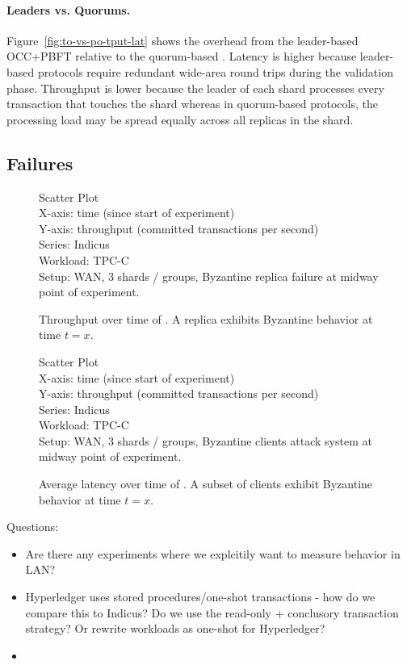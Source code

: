\paragraph{Leaders vs. Quorums.} Figure~\ref{fig:to-vs-po-tput-lat} shows the overhead from the leader-based
OCC+PBFT relative to the quorum-based \sys{}. Latency is higher because leader-based
protocols require redundant wide-area round trips during the validation phase.
Throughput is lower because the leader of each shard processes every transaction
that touches the shard whereas in quorum-based protocols, the processing load 
may be spread equally across all replicas in the shard.

\subsection{Failures}

\begin{figure}
  Scatter Plot\\
  X-axis: time (since start of experiment)\\
  Y-axis: throughput (committed transactions per second)\\
  Series: Indicus\\
  Workload: TPC-C\\
  Setup: WAN, 3 shards / groups, Byzantine replica failure at midway point of
  experiment.\\
  \caption{Throughput over time of \sys{}. A replica exhibits Byzantine
  behavior at time $t=x$.}
  \label{fig:failure-replica-tot}
\end{figure}

\begin{figure}
  Scatter Plot\\
  X-axis: time (since start of experiment)\\
  Y-axis: throughput (committed transactions per second)\\
  Series: Indicus\\
  Workload: TPC-C\\
  Setup: WAN, 3 shards / groups, Byzantine clients attack system at midway point
  of experiment.\\
  \caption{Average latency over time of \sys{}. A subset of clients exhibit
  Byzantine behavior at time $t=x$.}
  \label{fig:failure-clients-lot}
\end{figure}

Questions:
\begin{itemize}
  \item Are there any experiments where we explcitily want to measure behavior in LAN?
  \item Hyperledger uses stored procedures/one-shot transactions - how do we compare this to Indicus? Do we use the read-only + conclusory transaction strategy? Or rewrite workloads as one-shot for Hyperledger?
  \item 
\end{itemize}

